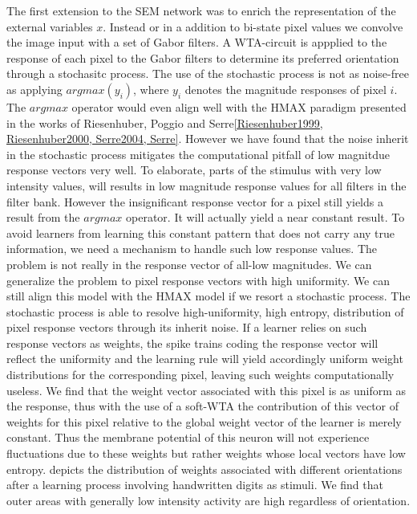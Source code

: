 \documentclass{report}
\begin{document}
The first extension to the SEM network was to enrich the representation of the external variables $x$. Instead or in a addition to bi-state pixel values we convolve the image input with a set of Gabor filters. A WTA-circuit is appplied to the response of each pixel to the Gabor filters to determine its preferred orientation through a stochasitc process. The use of the stochastic process is not as noise-free as applying $argmax(y_i)$, where $y_i$ denotes the magnitude responses of pixel $i$. The $argmax$ operator would even align well with the HMAX paradigm presented in the works of Riesenhuber, Poggio and Serre\cref{Riesenhuber1999, Riesenhuber2000, Serre2004, Serre}. However we have found that the noise inherit in the stochastic process mitigates the computational pitfall of low magnitdue response vectors very well. To elaborate, parts of the stimulus with very low intensity values, will results in low magnitude response values for all filters in the filter bank. However the insignificant response vector for a pixel still yields a result from the $argmax$ operator. It will actually yield a near constant result. To avoid learners from learning this constant pattern that does not carry any true information, we need a mechanism to handle such low response values. The problem is not really in the response vector of all-low magnitudes. We can generalize the problem to pixel response vectors with high uniformity. We can still align this model with the HMAX model if we resort a stochastic process. The stochastic process is able to resolve high-uniformity, high entropy, distribution of pixel response vectors through its inherit noise. If a learner relies on such response vectors as weights, the spike trains coding the response vector will reflect the uniformity and the learning rule will yield accordingly uniform weight distributions for the corresponding pixel, leaving such weights computationally useless. We find that the weight vector associated with this pixel is as uniform as the response, thus with the use of a soft-WTA the contribution of this vector of weights for this pixel relative to the global weight vector of the learner is merely constant. Thus the membrane potential of this neuron will not experience fluctuations due to these weights but rather weights whose local vectors have low entropy.  depicts the distribution of weights associated with different orientations after a learning process involving handwritten digits as stimuli. We find that outer areas with generally low intensity activity are high regardless of orientation.
\end{document}
